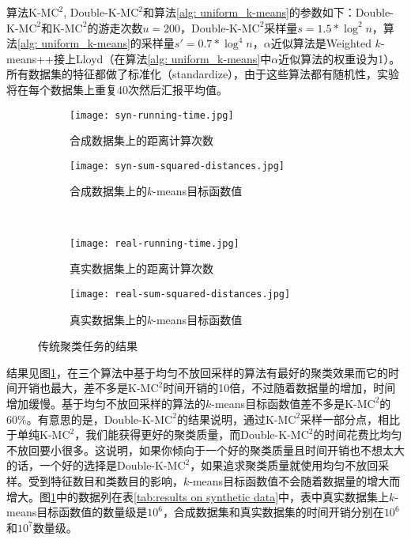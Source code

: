 算法K-M$\text{C}^2$, Double-K-M$\text{C}^2$和算法\ref{alg: uniform_k-means}的参数如下：Double-K-M$\text{C}^2$和K-M$\text{C}^2$的游走次数$u = 200$，Double-K-M$\text{C}^2$采样量$s = 1.5*\log^2 n$，算法\ref{alg: uniform_k-means}的采样量$s' = 0.7*\log^4 n$，$\alpha$近似算法是Weighted $k$-means++接上Lloyd（在算法\ref{alg: uniform_k-means}中$\alpha$近似算法的权重设为1）。所有数据集的特征都做了标准化（standardize），由于这些算法都有随机性，实验将在每个数据集上重复40次然后汇报平均值。
\begin{figure}[h]
	\begin{subfigure}{.47\linewidth}
		\texttt{[image: syn-running-time.jpg]}
		\caption{合成数据集上的距离计算次数}
	\end{subfigure}
	\begin{subfigure}{.47\linewidth}
		\texttt{[image: syn-sum-squared-distances.jpg]}
		\caption{合成数据集上的$k$-means目标函数值}
	\end{subfigure} \\
	\begin{subfigure}{.47\linewidth}
		\texttt{[image: real-running-time.jpg]}
		\caption{真实数据集上的距离计算次数}
	\end{subfigure}
	\begin{subfigure}{.47\linewidth}
		\texttt{[image: real-sum-squared-distances.jpg]}
		\caption{真实数据集上的$k$-means目标函数值}
	\end{subfigure}
    \caption{传统聚类任务的结果}
    \label{fig: kmeans-experiments}
\end{figure}
结果见图\ref{fig: kmeans-experiments}，在三个算法中基于均匀不放回采样的算法有最好的聚类效果而它的时间开销也最大，差不多是K-M$\text{C}^2$时间开销的10倍，不过随着数据量的增加，时间增加缓慢。基于均匀不放回采样的算法的$k$-means目标函数值差不多是K-M$\text{C}^2$的60\%。有意思的是，Double-K-M$\text{C}^2$的结果说明，通过K-M$\text{C}^2$采样一部分点，相比于单纯K-M$\text{C}^2$，我们能获得更好的聚类质量，而Double-K-M$\text{C}^2$的时间花费比均匀不放回要小很多。这说明，如果你倾向于一个好的聚类质量且时间开销也不想太大的话，一个好的选择是Double-K-M$\text{C}^2$，如果追求聚类质量就使用均匀不放回采样。受到特征数目和类数目的影响，$k$-means目标函数值不会随着数据量的增大而增大。图\ref{fig: kmeans-experiments}中的数据列在表\ref{tab:results on synthetic data}中，表中真实数据集上$k$-means目标函数值的数量级是$10^6$，合成数据集和真实数据集的时间开销分别在$10^6$和$10^7$数量级。

